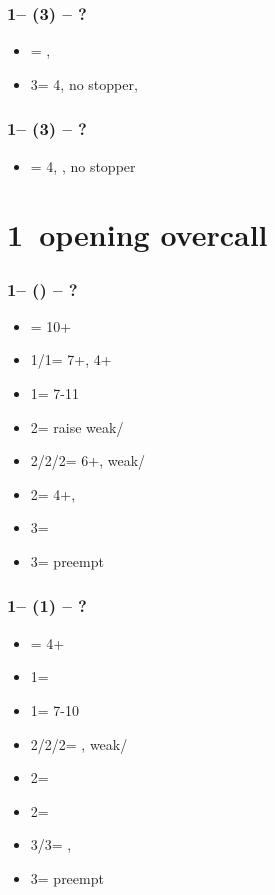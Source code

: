 \documentclass[12pt, a4paper]{report}
\begin{document}
\subsubsection*{1\clubs -- (3\hearts) -- ?}
\begin{itemize}
    \item \dbl = \spades, \invp
    \item 3\spades = 4\spades, no \hearts stopper, \gf
\end{itemize}

\subsubsection*{1\clubs -- (3\spades) -- ?}
\begin{itemize}
    \item \dbl = 4\hearts, \gf, no \spades stopper
\end{itemize}

\section*{\colorbox{blue!30}{1\diams\ opening overcall}}

\subsubsection*{1\diams -- (\dbl) -- ?}
\begin{itemize}
    \item \rdbl = 10+
    \item 1\hearts/1\spades = 7+\hcp, 4+
    \item 1\nt = 7-11
    \item 2\clubs = \diams raise weak/\gf
    \item 2\diams/2\hearts/2\spades = \trsf{\hearts/\spades/\clubs} 6+, weak/\gf
    \item 2\nt = 4+\diams, \invp
    \item 3\clubs = \inv
    \item 3\diams = preempt
\end{itemize}

\subsubsection*{1\diams -- (1\hearts) -- ?}
\begin{itemize}
    \item \dbl = 4+\spades
    \item 1\spades = \nt
    \item 1\nt = 7-10
    \item 2\clubs/2\hearts/2\spades = \trsf{\diams/\spades/\clubs}, weak/\gf
    \item 2\diams = \diams\ \inv
    \item 2\nt = \inv
    \item 3\clubs/3\spades = \nat, \inv
    \item 3\diams = preempt
\end{itemize}
\end{document}
